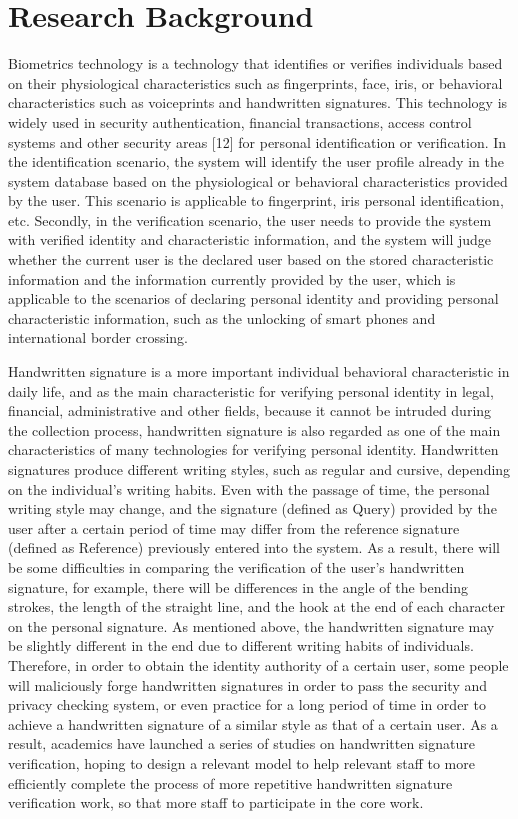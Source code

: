 \section{Research Background}

Biometrics technology is a technology that identifies or verifies individuals based on their physiological characteristics such as fingerprints, face, iris, or behavioral characteristics such as voiceprints and handwritten signatures. This technology is widely used in security authentication, financial transactions, access control systems and other security areas [12] for personal identification or verification. In the identification scenario, the system will identify the user profile already in the system database based on the physiological or behavioral characteristics provided by the user. This scenario is applicable to fingerprint, iris personal identification, etc. Secondly, in the verification scenario, the user needs to provide the system with verified identity and characteristic information, and the system will judge whether the current user is the declared user based on the stored characteristic information and the information currently provided by the user, which is applicable to the scenarios of declaring personal identity and providing personal characteristic information, such as the unlocking of smart phones and international border crossing.

Handwritten signature is a more important individual behavioral characteristic in daily life, and as the main characteristic for verifying personal identity in legal, financial, administrative and other fields, because it cannot be intruded during the collection process, handwritten signature is also regarded as one of the main characteristics of many technologies for verifying personal identity. Handwritten signatures produce different writing styles, such as regular and cursive, depending on the individual's writing habits. Even with the passage of time, the personal writing style may change, and the signature (defined as Query) provided by the user after a certain period of time may differ from the reference signature (defined as Reference) previously entered into the system. As a result, there will be some difficulties in comparing the verification of the user's handwritten signature, for example, there will be differences in the angle of the bending strokes, the length of the straight line, and the hook at the end of each character on the personal signature. As mentioned above, the handwritten signature may be slightly different in the end due to different writing habits of individuals. Therefore, in order to obtain the identity authority of a certain user, some people will maliciously forge handwritten signatures in order to pass the security and privacy checking system, or even practice for a long period of time in order to achieve a handwritten signature of a similar style as that of a certain user. As a result, academics have launched a series of studies on handwritten signature verification, hoping to design a relevant model to help relevant staff to more efficiently complete the process of more repetitive handwritten signature verification work, so that more staff to participate in the core work.

